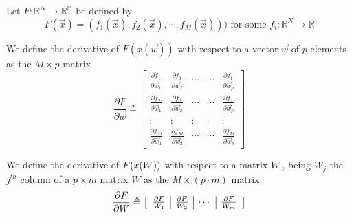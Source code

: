 
Let $F:\mathbb{R}^N \rightarrow \mathbb{R^M}$ be defined by
\begin{equation}
F(\vec{x}) = (f_1(\vec{x}),f_2(\vec{x}),\cdots,f_M(\vec{x}))) \text{    for some  } f_i:\mathbb{R}^N \rightarrow \mathbb{R}
\end{equation}

\begin{defn}
 We define the derivative of $F(x(\vec{w}))$ with respect to a vector $\vec{w}$ of $p$ elements as the $M \times p$ matrix
\begin{equation}
\frac{\partial F}{\partial \vec{w}} \triangleq
\begin{bmatrix}
   \frac{\partial f_1}{\partial \vec{w}_1}    & \frac{\partial f_1}{\partial \vec{w}_2}                & \cdots      & \cdots       & \frac{\partial f_1}{\partial \vec{w}_p}  \\
   \frac{\partial f_2}{\partial \vec{w}_1}    & \frac{\partial f_2}{\partial \vec{w}_2}                & \cdots      & \cdots       & \frac{\partial f_2}{\partial \vec{w}_p}  \\
   \vdots                & \vdots           & \vdots      & \vdots       &\vdots\\
   \frac{\partial f_M}{\partial \vec{w}_1}    & \frac{\partial f_M}{\partial \vec{w}_2}                & \cdots      & \cdots       & \frac{\partial f_M}{\partial \vec{w}_p}
\end{bmatrix}
\end{equation}
\end{defn}


\begin{defn}
We define the derivative of $F(x(W))$ with respect to a matrix $W$, being $W_j$ the $j^{th}$ column of a 
$p\times m$ matrix $W$ as the $M\times (p \cdot m )$ matrix:
\begin{equation}
\frac{\partial F}{\partial W} \triangleq
\left[
\begin{array}{c|c|c|c}
\frac{\partial F}{W_1} & \frac{\partial F}{W_2} & \cdots & \frac{\partial F}{W_m} \\
\end{array}
\right]
\end{equation}
\end{defn}




